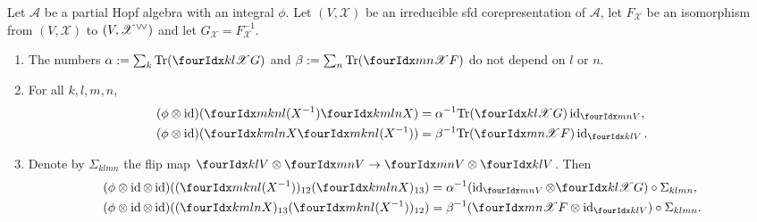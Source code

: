 \begin{Theorem} \label{thm:rep-orthogonality} Let $\mathcal{A}$ be a
  partial Hopf algebra with an integral $\phi$. Let $(V,\mathscr{X})$
  be an irreducible sfd corepresentation of $\mathscr{A}$, let
  $F_{\mathscr{X}}$ be an isomorphism from $(V,\mathscr{X})$ to
  $(V,\mathscr{X}^{\vee}\!{}^{\vee})$ and let
  $G_{\mathscr{X}}=F_{\mathscr{X}}^{-1}$.
  \begin{enumerate}
  \item The numbers $\alpha:=\sum_{k} \Tr (\Gr{G}{k}{l}{}{\mathscr{X}})$
    and $\beta:=\sum_{n} \Tr (\Gr{F}{m}{n}{}{\mathscr{X}})$ do not depend on $l$
    or $n$.
  \item  For all $k,l,m,n$,
    \begin{align*}
      (\phi \otimes \id)(\Gr{(X^{-1})}{m}{n}{k}{l}\Gr{X}{k}{l}{m}{n})
      &=\alpha^{-1}\Tr(\Gr{G}{k}{l}{}{\mathscr{X}})
      \id_{\Gru{V}{m}{n}}, \\
      (\phi \otimes \id)(\Gr{X}{k}{l}{m}{n}\Gr{(X^{-1})}{m}{n}{k}{l})
      &=\beta^{-1}\Tr(\Gr{F}{m}{n}{}{\mathscr{X}})
      \id_{\Gru{V}{k}{l}}.
    \end{align*}
  \item Denote by $\Sigma_{klmn}$ the flip map $\Gru{V}{k}{l}
    \otimes \Gru{V}{m}{n} \to \Gru{V}{m}{n}
    \otimes \Gru{V}{k}{l}$. Then
 \begin{align*}
   (\phi \otimes \id \otimes
   \id)((\Gr{(X^{-1})}{m}{n}{k}{l})_{12}(\Gr{X}{k}{l}{m}{n})_{13}) &=
   \alpha^{-1}
   (\id_{\Gru{V}{m}{n}} \otimes \Gr{G}{k}{l}{}{\mathscr{X}})
   \circ \Sigma_{klmn}, \\
   (\phi \otimes \id \otimes
   \id)((\Gr{X}{k}{l}{m}{n})_{13}(\Gr{(X^{-1})}{m}{n}{k}{l})_{12}) &= \beta^{-1} (\Gr{F}{m}{n}{}{\mathscr{X}}
   \otimes \id_{\Gru{V}{k}{l}}) \circ \Sigma_{klmn}.
 \end{align*}
\end{enumerate}
  \end{Theorem}
